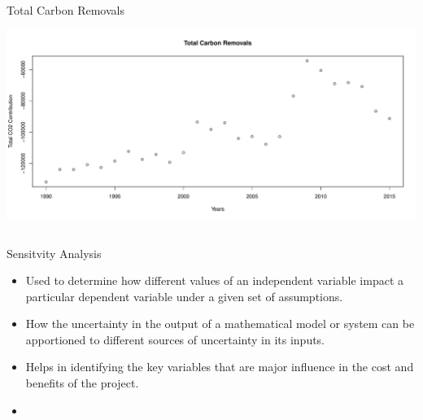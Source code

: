 \documentclass[final]{beamer}\usepackage[]{graphicx}\usepackage[]{color}
\makeatletter
\def\maxwidth{ %
  \ifdim\Gin@nat@width>\linewidth
    \linewidth
  \else
    \Gin@nat@width
  \fi
}
\newenvironment{knitrout}{}{} %
\newlength{\onecolwid}
\newlength{\twocolwid}
\makeatother
\begin{document}
\begin{frame}[t]
\begin{columns}[t]
\begin{column}{\twocolwid}

\begin{alertblock}{Total Carbon Removals}
\vspace{0ex}
\centering
\begin{knitrout}
\color{fgcolor}

{\centering \includegraphics[width=\maxwidth]{figure/RCODE-1} 

}



\end{knitrout}
\vfill
\end{alertblock} 


\begin{columns}[t,totalwidth=\twocolwid] %

\begin{column}{\onecolwid} %


\begin{block}{Sensitvity Analysis}
\begin{itemize}
\item Used to determine how different values of an independent variable impact a particular dependent variable under a given set of assumptions. 
\item How the uncertainty in the output of a mathematical model or system can be apportioned to different sources of uncertainty in its inputs.
\item Helps in identifying the key variables that are major influence in the cost and benefits of the project.
\item 
\end{itemize}


\end{block}
\end{column}
\end{columns}
\end{column}
\end{columns}
\end{frame}
\end{document}
